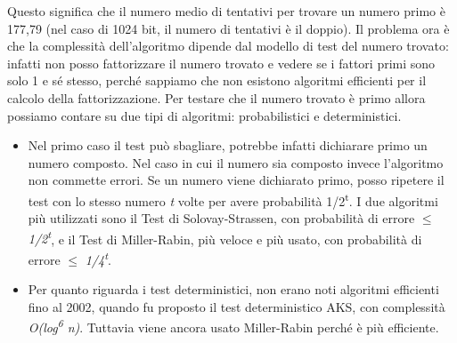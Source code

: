 Questo significa che il numero medio di tentativi per trovare un numero primo è 177,79 (nel caso di 1024 bit, il numero di tentativi è il doppio). Il problema ora è che la complessità dell'algoritmo dipende dal modello di test del numero trovato: infatti non posso fattorizzare il numero trovato e vedere se i fattori primi sono solo 1 e sé stesso, perché sappiamo che non esistono algoritmi efficienti per il calcolo della fattorizzazione. Per testare che il numero trovato è primo allora possiamo contare su due tipi di algoritmi: probabilistici e deterministici. 
\begin{itemize}
    \item Nel primo caso il test può sbagliare, potrebbe infatti dichiarare primo un numero composto. Nel caso in cui il numero sia composto invece l'algoritmo non commette errori. Se un numero viene dichiarato primo, posso ripetere il test con lo stesso numero \textit{t} volte per avere probabilità 1/2\textsuperscript{t}. I due algoritmi più utilizzati sono il Test di Solovay-Strassen, con probabilità di errore $\leq$ \textit{1/2\textsuperscript{t}}, e il Test di Miller-Rabin, più veloce e più usato, con probabilità di errore $\leq$ \textit{1/4\textsuperscript{t}}.
    \item Per quanto riguarda i test deterministici, non erano noti algoritmi efficienti fino al 2002, quando fu proposto il test deterministico AKS, con complessità \textit{O(log\textsuperscript{6} n)}. Tuttavia viene ancora usato Miller-Rabin perché è più efficiente.
\end{itemize}

\vspace{5mm}

